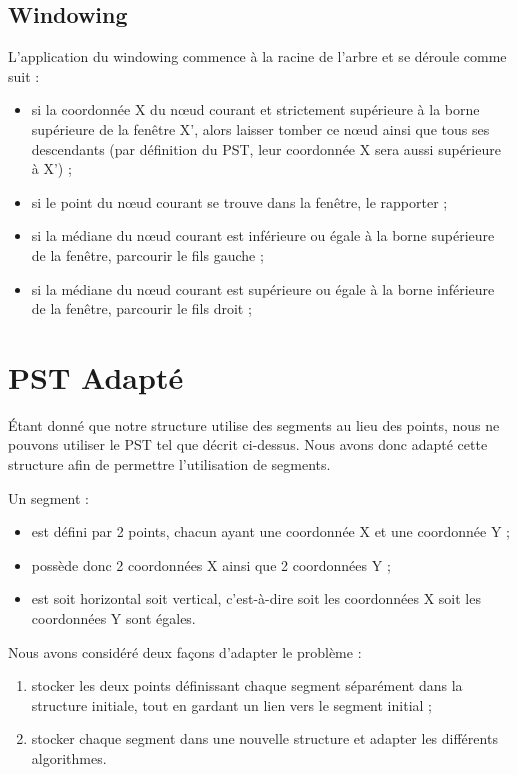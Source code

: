 \documentclass[10pt,a4paper]{article}
\begin{document}

\subsection{Windowing}
L'application du windowing commence à la racine de l'arbre et se déroule comme suit :
\begin{itemize}
	\item si la coordonnée X du nœud courant et strictement supérieure à la borne supérieure de la fenêtre X', alors laisser tomber ce nœud ainsi que tous ses descendants (par définition du PST, leur coordonnée X sera aussi supérieure à X') ;
	\item si le point du nœud courant se trouve dans la fenêtre, le rapporter ;
	\item si la médiane du nœud courant est inférieure ou égale à la borne supérieure de la fenêtre, parcourir le fils gauche ;
	\item si la médiane du nœud courant est supérieure ou égale à la borne inférieure de la fenêtre, parcourir le fils droit ;
\end{itemize}


\newpage
\section{PST Adapté}

Étant donné que notre structure utilise des segments au lieu des points, nous ne pouvons utiliser le PST tel que décrit ci-dessus. Nous avons donc adapté cette structure afin de permettre l'utilisation de segments.

Un segment :
\begin{itemize}
	\item est défini par 2 points, chacun ayant une coordonnée X et une coordonnée Y ;
	\item possède donc 2 coordonnées X ainsi que 2 coordonnées Y ;
	\item est soit horizontal soit vertical, c'est-à-dire soit les coordonnées X soit les coordonnées Y sont égales.
\end{itemize}

Nous avons considéré deux façons d'adapter le problème :
\begin{enumerate}
	\item stocker les deux points définissant chaque segment séparément dans la structure initiale, tout en gardant un lien vers le segment initial ;
	\item stocker chaque segment dans une nouvelle structure et adapter les différents algorithmes.
\end{enumerate}
\end{document}
